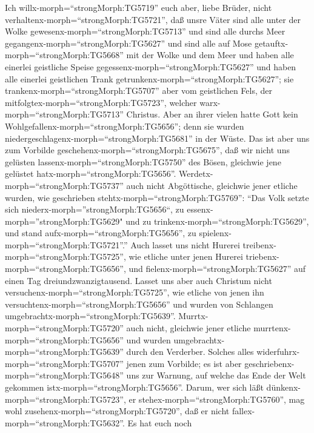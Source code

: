  Ich willx-morph=``strongMorph:TG5719'' euch aber, liebe
Brüder, nicht verhaltenx-morph=``strongMorph:TG5721'', daß unsre Väter
sind alle unter der Wolke gewesenx-morph=``strongMorph:TG5713'' und sind
alle durchs Meer gegangenx-morph=``strongMorph:TG5627''  und
sind alle auf Mose getauftx-morph=``strongMorph:TG5668'' mit der Wolke
und dem Meer  und haben alle einerlei geistliche Speise
gegessenx-morph=``strongMorph:TG5627''  und haben alle
einerlei geistlichen Trank getrunkenx-morph=``strongMorph:TG5627''; sie
trankenx-morph=``strongMorph:TG5707'' aber vom geistlichen Fels, der
mitfolgtex-morph=``strongMorph:TG5723'', welcher
warx-morph=``strongMorph:TG5713'' Christus.  Aber an ihrer
vielen hatte Gott kein Wohlgefallenx-morph=``strongMorph:TG5656''; denn
sie wurden niedergeschlagenx-morph=``strongMorph:TG5681'' in der Wüste.
 Das ist aber uns zum Vorbilde
geschehenx-morph=``strongMorph:TG5675'', daß wir nicht uns gelüsten
lassenx-morph=``strongMorph:TG5750'' des Bösen, gleichwie jene gelüstet
hatx-morph=``strongMorph:TG5656''. 
Werdetx-morph=``strongMorph:TG5737'' auch nicht Abgöttische, gleichwie
jener etliche wurden, wie geschrieben
stehtx-morph=``strongMorph:TG5769'': ``Das Volk setzte sich
niederx-morph=''strongMorph:TG5656``, zu
essenx-morph=''strongMorph:TG5629" und zu
trinkenx-morph=``strongMorph:TG5629'', und stand
aufx-morph=``strongMorph:TG5656'', zu
spielenx-morph=``strongMorph:TG5721''.''  Auch lasset uns
nicht Hurerei treibenx-morph=``strongMorph:TG5725'', wie etliche unter
jenen Hurerei triebenx-morph=``strongMorph:TG5656'', und
fielenx-morph=``strongMorph:TG5627'' auf einen Tag
dreiundzwanzigtausend.  Lasset uns aber auch Christum nicht
versuchenx-morph=``strongMorph:TG5725'', wie etliche von jenen ihn
versuchtenx-morph=``strongMorph:TG5656'' und wurden von Schlangen
umgebrachtx-morph=``strongMorph:TG5639''. 
Murrtx-morph=``strongMorph:TG5720'' auch nicht, gleichwie jener etliche
murrtenx-morph=``strongMorph:TG5656'' und wurden
umgebrachtx-morph=``strongMorph:TG5639'' durch den Verderber.
 Solches alles widerfuhrx-morph=``strongMorph:TG5707''
jenen zum Vorbilde; es ist aber
geschriebenx-morph=``strongMorph:TG5648'' uns zur Warnung, auf welche
das Ende der Welt gekommen istx-morph=``strongMorph:TG5656''.
 Darum, wer sich läßt dünkenx-morph=``strongMorph:TG5723'',
er stehex-morph=``strongMorph:TG5760'', mag wohl
zusehenx-morph=``strongMorph:TG5720'', daß er nicht
fallex-morph=``strongMorph:TG5632''.  Es hat euch noch
